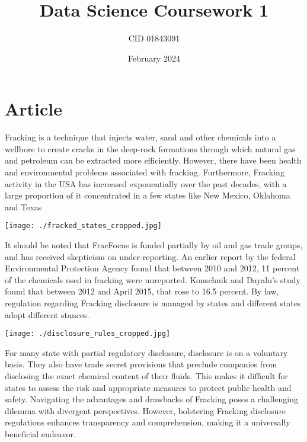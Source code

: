 \documentclass{article}
\title{Data Science Coursework 1}
\author{CID 01843091}
\date{February 2024}
\begin{document}
\maketitle

\section{Article}

Fracking is a technique that injects water, sand and other chemicals into a wellbore to create cracks in the deep-rock formations through which natural gas 
and petroleum can be extracted more efficiently. However, there have been health and environmental problems associated with fracking. Furthermore, Fracking 
activity in the USA has increased exponentially over the past decades, with a large proportion of it concentrated in a few states like New Mexico, Oklahoma
and Texas

\texttt{[image: ./fracked\_states\_cropped.jpg]}

It should be noted that FracFocus is funded partially by oil and gas trade groups, and has received skepticism on under-reporting. An earlier report by the 
federal Environmental Protection Agency found that between 2010 and 2012, 11 percent of the chemicals used in fracking were unreported. Konschnik and Dayalu’s 
study found that between 2012 and April 2015, that rose to 16.5 percent. By law, regulation regarding Fracking disclosure is managed by states and different 
states adopt different stances.

\texttt{[image: ./disclosure\_rules\_cropped.jpg]}

For many state with partial regulatory disclosure, disclosure is on a voluntary basis. They also have trade secret provisions that preclude companies from 
disclosing the exact chemical content of their fluids. This makes it difficult for states to assess the risk and appropriate measures to protect public health 
and safety. Navigating the advantages and drawbacks of Fracking poses a challenging dilemma with divergent perspectives. However, bolstering Fracking disclosure 
regulations enhances transparency and comprehension, making it a universally beneficial endeavor.
\end{document}
